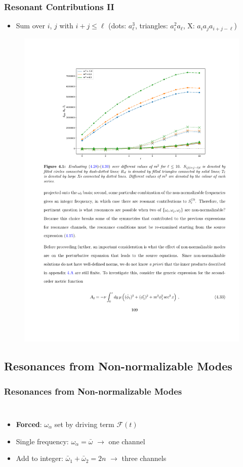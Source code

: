 \documentclass[mathserif,10pt]{beamer}
\newcommand{\bi}{\begin{itemize}}
\newcommand{\ei}{\end{itemize}}
\newcommand{\its}{\item}
\begin{document}
{\frame
{
   \frametitle{Resonant Contributions II} 
   \bi
   \its Sum over $i$, $j$ with $i + j \leq \ell$ (dots: $a_\ell^3$, triangles: $a_i^2 a_\ell$, X: $a_i a_j a_{i + j -\ell}$)
   \ei
   \begin{figure}
   \centering
    \includegraphics[scale=0.75]{norm} 
    \end{figure}
}
   


\subsection{Resonances from Non-normalizable Modes}
\frame
{
  \frametitle{Resonances from Non-normalizable Modes}
  \begin{columns}
  \bi
  \its {\bf Forced}: $\omega_\alpha$ set by driving term $\mathcal F(t)$
  \its\alert<1>{Single frequency}: $\omega_\alpha = \bar\omega$ $\to$ one channel
  \its<2->{\alert<2>{Add to integer}: $\bar\omega_1 + \bar\omega_2 = 2n$ $\to$ three channels}
  \ei


\end{columns}}}
\end{document}
